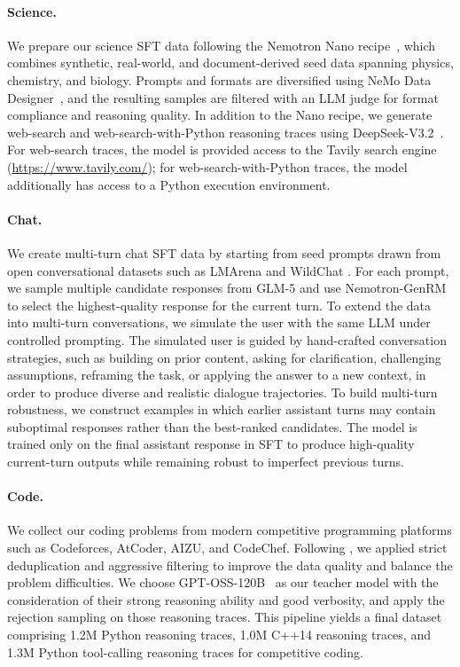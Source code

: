 \paragraph{Science.}
We prepare our science SFT data following the Nemotron Nano recipe~\citep{nvidia2025nemotron3nanoopen}, which combines synthetic, real-world, and document-derived seed data spanning physics, chemistry, and biology. Prompts and formats are diversified using NeMo Data Designer~\citep{nemo-data-designer}, and the resulting samples are filtered with an LLM judge for format compliance and reasoning quality. In addition to the Nano recipe, we generate web-search and web-search-with-Python reasoning traces using DeepSeek-V3.2~\citep{deepseekai2024deepseekv32}. For web-search traces, the model is provided access to the Tavily search engine (\url{https://www.tavily.com/}); for web-search-with-Python traces, the model additionally has access to a Python execution environment.

\paragraph{Chat.}
We create multi-turn chat SFT data by starting from seed prompts drawn from open conversational datasets such as LMArena \citep{chiang2024chatbot} and WildChat \citep{li2024wildchat}. For each prompt, we sample multiple candidate responses from GLM-5 \citep{glm5team2026glm5vibecodingagentic} and use Nemotron-GenRM \citep{Wang2025HelpSteer3Preference} to select the highest-quality response for the current turn. To extend the data into multi-turn conversations, we simulate the user with the same LLM under controlled prompting. The simulated user is guided by hand-crafted conversation strategies, such as building on prior content, asking for clarification, challenging assumptions, reframing the task, or applying the answer to a new context, in order to produce diverse and realistic dialogue trajectories. To build multi-turn robustness, we construct examples in which earlier assistant turns may contain suboptimal responses rather than the best-ranked candidates. The model is trained only on the final assistant response in SFT to produce high-quality current-turn outputs while remaining robust to imperfect previous turns.

\paragraph{Code.}
We collect our coding problems from modern competitive programming platforms such as Codeforces, AtCoder, AIZU, and CodeChef. Following \citet{yang2026nemotron}, we applied strict deduplication and aggressive filtering to improve the data quality and balance the problem difficulties. We choose GPT-OSS-120B~\citep{agarwal2025gpt} as our teacher model with the consideration of their strong reasoning ability and good verbosity, and apply the rejection sampling on those reasoning traces. This pipeline yields a final dataset comprising 1.2M Python reasoning traces, 1.0M C++14 reasoning traces, and 1.3M Python tool-calling reasoning traces for competitive coding.


